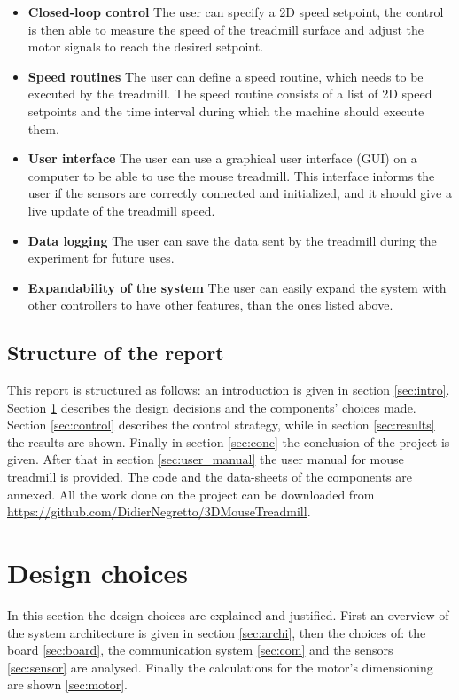 \documentclass[12pt,a4paper, twoside]{article}
\begin{document}
\begin{itemize}
	\item \textbf{Closed-loop control} The user can specify a 2D speed setpoint, the control is then able to measure the speed of the treadmill surface and adjust the motor signals to reach the desired setpoint.
	\item \textbf{Speed routines} The user can define a speed routine, which needs to be executed by the treadmill. The speed routine consists of a list of 2D speed setpoints and the time interval during which the machine should execute them.
	\item \textbf{User interface} The user can use a graphical user interface (GUI) on a computer to be able to use the mouse treadmill. This interface informs the user if the sensors are correctly connected and initialized, and it should give a live update of the treadmill speed.
	\item \textbf{Data logging} The user can save the data sent by the treadmill during the experiment for future uses. 
	\item \textbf{Expandability of the system} The user can easily expand the system with other controllers to have other features, than the ones listed above.
\end{itemize}

\subsection{Structure of the report}\label{sec:plan}
This report is structured as follows: an introduction is given in section \ref{sec:intro}. Section \ref{sec:design} describes the design decisions and the components' choices made. Section \ref{sec:control} describes the control strategy, while in section \ref{sec:results} the results are shown.
Finally in section \ref{sec:conc} the conclusion of the project is given. After that in section \ref{sec:user_manual} the user manual for mouse treadmill is provided. The code and the data-sheets of the components are annexed. All the work done on the project can be downloaded from \url{https://github.com/DidierNegretto/3DMouseTreadmill}.
\newpage


\section{Design choices}\label{sec:design}
In this section the design choices are explained and justified. First an overview of the system architecture is given in section \ref{sec:archi}, then the choices of: the board \ref{sec:board}, the communication system \ref{sec:com} and the sensors \ref{sec:sensor} are analysed. Finally the calculations for the motor's dimensioning are shown \ref{sec:motor}.
\end{document}
